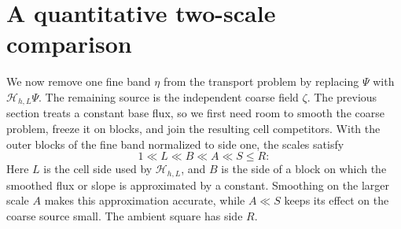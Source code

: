 \documentclass{smfart}
\theoremstyle{definition}
\newcommand{\1}{\mathbf 1}
\begin{document}
\section{A quantitative two-scale comparison}\label{sec:two-scale}

We now remove one fine band $\eta$ from the transport problem by
replacing $\Psi$ with $\mathcal H_{h,L}\Psi$.  The remaining source is
the independent coarse field $\zeta$.  The previous section treats a
constant base flux, so we first need room to smooth the coarse problem,
freeze it on blocks, and join the resulting cell competitors.
With the outer blocks of the fine band normalized to side one, the
scales satisfy
\[
1\ll L\ll B\ll A\ll S\leq R:
\]
Here $L$ is the cell side used by $\mathcal H_{h,L}$, and $B$ is the
side of a block on which the smoothed flux or slope is approximated by a
constant.  Smoothing on the larger scale $A$ makes this approximation
accurate, while $A\ll S$ keeps its effect on the coarse source small.
The ambient square has side $R$.
\end{document}
